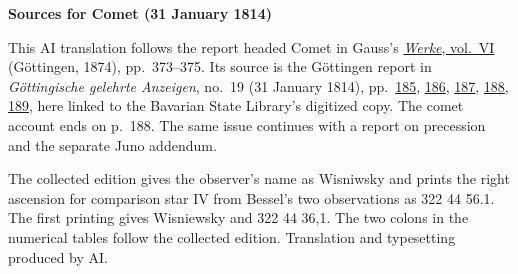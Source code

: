 \clearpage\thispagestyle{empty}
\begin{center}\textbf{Sources for Comet (31 January 1814)}\end{center}
\noindent This AI translation follows the report headed Comet in Gauss’s \href{https://gdz.sub.uni-goettingen.de/id/PPN236007467}{\textit{Werke}, vol.~VI} (Göttingen, 1874), pp.~373--375. Its source is the Göttingen report in \textit{Göttingische gelehrte Anzeigen}, no.~19 (31 January 1814), pp.~\href{https://api.digitale-sammlungen.de/iiif/image/v2/bsb10538685_00191/full/1600,/0/default.jpg}{185}, \href{https://api.digitale-sammlungen.de/iiif/image/v2/bsb10538685_00192/full/1600,/0/default.jpg}{186}, \href{https://api.digitale-sammlungen.de/iiif/image/v2/bsb10538685_00193/full/1600,/0/default.jpg}{187}, \href{https://api.digitale-sammlungen.de/iiif/image/v2/bsb10538685_00194/full/1600,/0/default.jpg}{188}, \href{https://api.digitale-sammlungen.de/iiif/image/v2/bsb10538685_00195/full/1600,/0/default.jpg}{189}, here linked to the Bavarian State Library’s digitized copy. The comet account ends on p.~188. The same issue continues with a report on precession and the separate Juno addendum.
\par\smallskip\noindent The collected edition gives the observer’s name as Wisniwsky and prints the right ascension for comparison star IV from Bessel’s two observations as 322 44 56.1. The first printing gives Wisniewsky and 322 44 36,1. The two colons in the numerical tables follow the collected edition. Translation and typesetting produced by AI.
\clearpage
